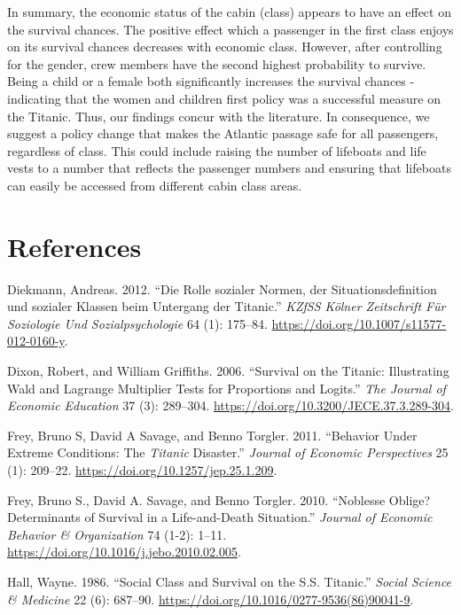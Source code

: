 \documentclass[
]{article}
\begin{document}
In summary, the economic status of the cabin (class) appears to have an
effect on the survival chances. The positive effect which a passenger in
the first class enjoys on its survival chances decreases with economic
class. However, after controlling for the gender, crew members have the
second highest probability to survive. Being a child or a female both
significantly increases the survival chances - indicating that the women
and children first policy was a successful measure on the Titanic. Thus,
our findings concur with the literature. In consequence, we suggest a
policy change that makes the Atlantic passage safe for all passengers,
regardless of class. This could include raising the number of lifeboats
and life vests to a number that reflects the passenger numbers and
ensuring that lifeboats can easily be accessed from different cabin
class areas.

\newpage

\hypertarget{references}{%
\section{References}\label{references}}

\hypertarget{refs}{}
\leavevmode\hypertarget{ref-diekmann2012}{}%
Diekmann, Andreas. 2012. ``Die Rolle sozialer Normen, der
Situationsdefinition und sozialer Klassen beim Untergang der Titanic.''
\emph{KZfSS Kölner Zeitschrift Für Soziologie Und Sozialpsychologie} 64
(1): 175--84. \url{https://doi.org/10.1007/s11577-012-0160-y}.

\leavevmode\hypertarget{ref-dixon2006}{}%
Dixon, Robert, and William Griffiths. 2006. ``Survival on the Titanic:
Illustrating Wald and Lagrange Multiplier Tests for Proportions and
Logits.'' \emph{The Journal of Economic Education} 37 (3): 289--304.
\url{https://doi.org/10.3200/JECE.37.3.289-304}.

\leavevmode\hypertarget{ref-frey2011}{}%
Frey, Bruno S, David A Savage, and Benno Torgler. 2011. ``Behavior Under
Extreme Conditions: The \emph{Titanic} Disaster.'' \emph{Journal of
Economic Perspectives} 25 (1): 209--22.
\url{https://doi.org/10.1257/jep.25.1.209}.

\leavevmode\hypertarget{ref-frey2010}{}%
Frey, Bruno S., David A. Savage, and Benno Torgler. 2010. ``Noblesse
Oblige? Determinants of Survival in a Life-and-Death Situation.''
\emph{Journal of Economic Behavior \& Organization} 74 (1-2): 1--11.
\url{https://doi.org/10.1016/j.jebo.2010.02.005}.

\leavevmode\hypertarget{ref-hall1986}{}%
Hall, Wayne. 1986. ``Social Class and Survival on the S.S. Titanic.''
\emph{Social Science \& Medicine} 22 (6): 687--90.
\url{https://doi.org/10.1016/0277-9536(86)90041-9}.
\end{document}
